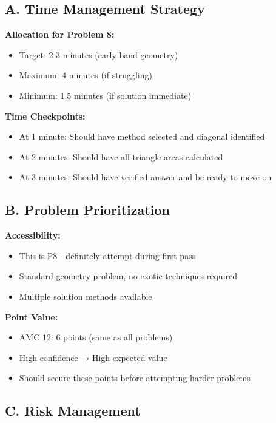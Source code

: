 \documentclass[11pt]{article}
\begin{document}
\begin{competitionbox}
\subsection*{A. Time Management Strategy}

\textbf{Allocation for Problem 8:}
\begin{itemize}
    \item Target: 2-3 minutes (early-band geometry)
    \item Maximum: 4 minutes (if struggling)
    \item Minimum: 1.5 minutes (if solution immediate)
\end{itemize}

\textbf{Time Checkpoints:}
\begin{itemize}
    \item At 1 minute: Should have method selected and diagonal identified
    \item At 2 minutes: Should have all triangle areas calculated
    \item At 3 minutes: Should have verified answer and be ready to move on
\end{itemize}

\subsection*{B. Problem Prioritization}

\textbf{Accessibility:}
\begin{itemize}
    \item This is P8 - definitely attempt during first pass
    \item Standard geometry problem, no exotic techniques required
    \item Multiple solution methods available
\end{itemize}

\textbf{Point Value:}
\begin{itemize}
    \item AMC 12: 6 points (same as all problems)
    \item High confidence → High expected value
    \item Should secure these points before attempting harder problems
\end{itemize}

\subsection*{C. Risk Management}


\end{competitionbox}
\end{document}

